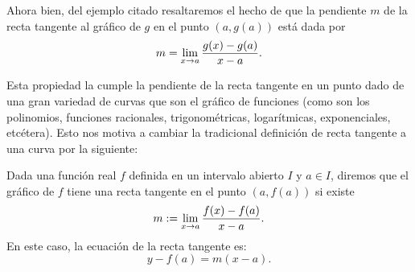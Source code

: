 Ahora bien, del ejemplo citado resaltaremos el hecho de que la pendiente $m$ de la recta tangente
al gráfico de $g$ en el punto $(a,g(a))$ está dada por
\[
m = \limjc{\frac{g(x) - g(a)}{x - a}}{x}{a}.
\]

Esta propiedad la cumple la pendiente de la recta tangente en un punto dado de una gran variedad de
curvas que son el gráfico de funciones (como son los polinomios, funciones racionales,
trigonométricas, logarítmicas, exponenciales, etcétera). Esto nos motiva a cambiar la tradicional
definición de recta tangente a una curva por la siguiente:

\begin{defical}
Dada una función real $f$ definida en un intervalo abierto $I$ y $a \in I$, diremos que el gráfico
de $f$ tiene una recta tangente en el punto $(a, f(a))$ si existe
\[
m:= \limjc{\frac{f(x) - f(a)}{x - a}}{x}{a}.
\]
En este caso, la ecuación de la recta tangente es:
\[
y - f(a) = m(x - a).
\]
\end{defical}

